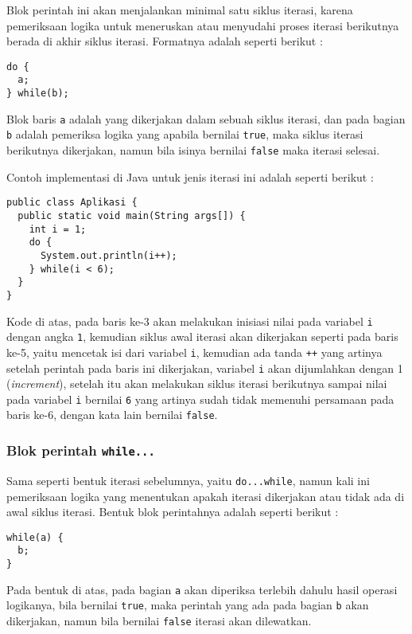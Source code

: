 Blok perintah ini akan menjalankan minimal satu siklus iterasi, karena pemeriksaan logika untuk meneruskan atau menyudahi proses iterasi berikutnya berada di akhir siklus iterasi. Formatnya adalah seperti berikut :

\begin{lstlisting}
do {
  a;
} while(b);
\end{lstlisting}

Blok baris \texttt{a} adalah yang dikerjakan dalam sebuah siklus iterasi, dan pada bagian \texttt{b} adalah pemeriksa logika yang apabila bernilai \texttt{true}, maka siklus iterasi berikutnya dikerjakan, namun bila isinya bernilai \texttt{false} maka iterasi selesai.

Contoh implementasi di Java untuk jenis iterasi ini adalah seperti berikut :

\begin{lstlisting}
public class Aplikasi {
  public static void main(String args[]) {
    int i = 1;
    do {
      System.out.println(i++);
    } while(i < 6);
  }
}
\end{lstlisting}

Kode di atas, pada baris ke-3 akan melakukan inisiasi nilai pada variabel \texttt{i} dengan angka \texttt{1}, kemudian siklus awal iterasi akan dikerjakan seperti pada baris ke-5, yaitu mencetak isi dari variabel \texttt{i}, kemudian ada tanda \texttt{++} yang artinya setelah perintah pada baris ini dikerjakan, variabel \texttt{i} akan dijumlahkan dengan 1 (\textit{increment}), setelah itu akan melakukan siklus iterasi berikutnya sampai nilai pada variabel \texttt{i} bernilai \texttt{6} yang artinya sudah tidak memenuhi persamaan pada baris ke-6, dengan kata lain bernilai \texttt{false}.

\subsubsection{Blok perintah \texttt{while...}}

Sama seperti bentuk iterasi sebelumnya, yaitu \texttt{do...while}, namun kali ini pemeriksaan logika yang menentukan apakah iterasi dikerjakan atau tidak ada di awal siklus iterasi. Bentuk blok perintahnya adalah seperti berikut :

\begin{lstlisting}
while(a) {
  b;
}
\end{lstlisting}

Pada bentuk di atas, pada bagian \texttt{a} akan diperiksa terlebih dahulu hasil operasi logikanya, bila bernilai \texttt{true}, maka perintah yang ada pada bagian \texttt{b} akan dikerjakan, namun bila bernilai \texttt{false} iterasi akan dilewatkan.

